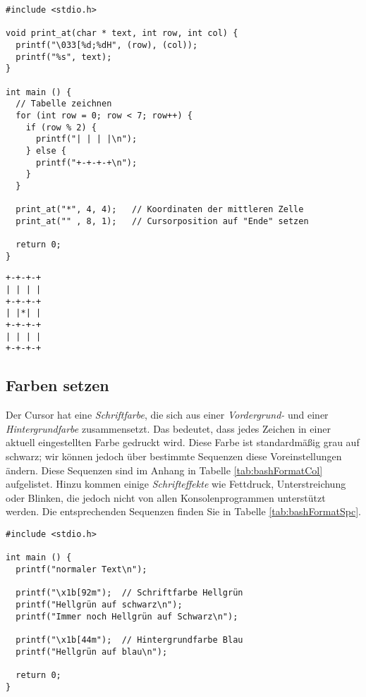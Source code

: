 \begin{codebox}
\begin{verbatim}
#include <stdio.h>

void print_at(char * text, int row, int col) {
  printf("\033[%d;%dH", (row), (col));
  printf("%s", text);
}

int main () {
  // Tabelle zeichnen
  for (int row = 0; row < 7; row++) {
    if (row % 2) {
      printf("| | | |\n");
    } else {
      printf("+-+-+-+\n");
    }
  }
  
  print_at("*", 4, 4);   // Koordinaten der mittleren Zelle
  print_at("" , 8, 1);   // Cursorposition auf "Ende" setzen
  
  return 0;
}
\end{verbatim}
\end{codebox}

\begin{cmdbox}
\begin{verbatim}
+-+-+-+
| | | |
+-+-+-+
| |*| |
+-+-+-+
| | | |
+-+-+-+
\end{verbatim}
\end{cmdbox}

\subsection{Farben setzen}
Der Cursor hat eine \emph{Schriftfarbe}, die sich aus einer \emph{Vordergrund-} und einer \emph{Hintergrundfarbe} zusammensetzt. Das bedeutet, dass jedes Zeichen in einer aktuell eingestellten Farbe gedruckt wird. Diese Farbe ist standardmäßig grau auf schwarz; wir können jedoch über bestimmte Sequenzen diese Voreinstellungen ändern. Diese Sequenzen sind im Anhang in Tabelle \ref{tab:bashFormatCol} aufgelistet. Hinzu kommen einige \emph{Schrifteffekte} wie Fettdruck, Unterstreichung oder Blinken, die jedoch nicht von allen Konsolenprogrammen unterstützt werden. Die entsprechenden Sequenzen finden Sie in Tabelle \ref{tab:bashFormatSpc}.

\begin{codebox}
\begin{verbatim}
#include <stdio.h>

int main () {
  printf("normaler Text\n");
  
  printf("\x1b[92m");  // Schriftfarbe Hellgrün
  printf("Hellgrün auf schwarz\n");
  printf("Immer noch Hellgrün auf Schwarz\n");
  
  printf("\x1b[44m");  // Hintergrundfarbe Blau
  printf("Hellgrün auf blau\n");
  
  return 0;
}
\end{verbatim}
\end{codebox}

